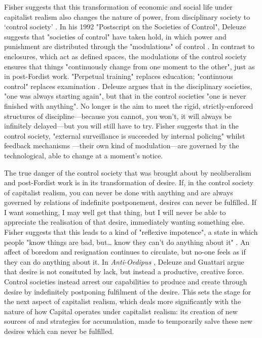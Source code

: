 Fisher suggests that this transformation of economic and social life under capitalist realism also changes the nature of power, from disciplinary society to `control society' \citeyearpar[p. 22]{fisher_capitalist_2009}. In his 1992 "Postscript on the Societies of Control", Deleuze suggests that "societies of control" have taken hold, in which power and punishment are distributed through the "modulations" of control \citep[p. 4]{gilles_deleuze_postscript_1992}. In contrast to enclosures, which act as defined spaces, the modulations of the control society ensures that things "continuously change from one moment to the other", just as in post-Fordist work. "Perpetual training" replaces education; "continuous control" replaces examination \citep[p. 5]{gilles_deleuze_postscript_1992}. Deleuze argues that in the disciplinary societies, "one was always starting again", but that in the control societies "one is never finished with anything". No longer is the aim to meet the rigid, strictly-enforced structures of discipline—because you cannot, you won't, it will always be infinitely delayed—but you will still have to try. Fisher suggests that in the control society, "external surveillance is succeeded by internal policing" \citep[p. 22]{fisher_capitalist_2009} whilst feedback mechanisms —their own kind of modulation—are governed by the technological, able to change at a moment's notice. 

The true danger of the control society that was brought about by neoliberalism and post-Fordist work is in its transformation of desire. If, in the control society of capitalist realism, you can never be done with anything and are always governed by relations of indefinite postponement, desires can never be fulfilled. If I want something, I may well get that thing, but I will never be able to appreciate the realisation of that desire, immediately wanting something else. Fisher suggests that this leads to a kind of "reflexive impotence", a state in which people "know things are bad, but\ldots{} know they can't do anything about it" \citep[p. 21]{fisher_capitalist_2009}. An affect of boredom and resignation continues to circulate, but no-one feels as if they can do anything about it. In \emph{Anti-Oedipus} \citeyearpar{deleuze_anti-oedipus:_1983}, Deleuze and Guattari argue that desire is not consituted by lack, but instead a productive, creative force. Control societies instead arrest our capabilities to produce and create through desire by indefinitely postponing fulfilment of the desire.  This sets the stage for the next aspect of capitalist realism, which deals more significantly with the nature of how Capital operates under capitalist realism: its creation of new sources of and strategies for accumulation, made to temporarily salve these new desires which can never be fulfilled.

